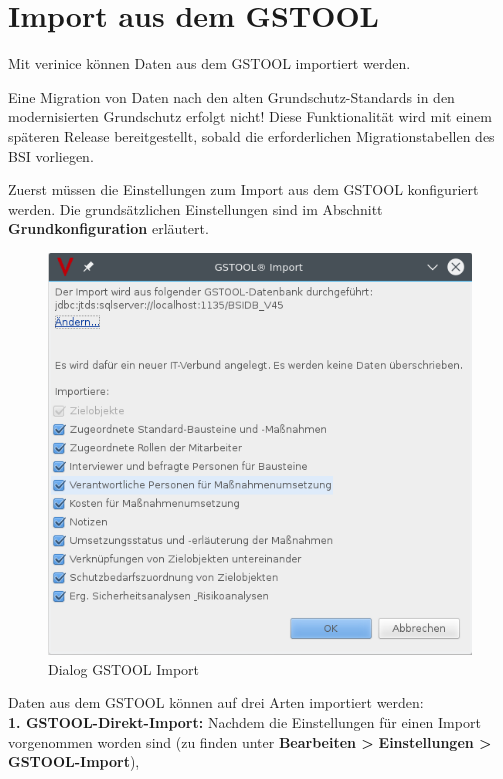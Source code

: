 \documentclass[a4paper,10pt]{book}
\begin{document}
\section{Import aus dem GSTOOL} \label{Import aus dem GSTOOL}
Mit verinice können Daten aus dem \textsc{GSTOOL} importiert werden.

Eine Migration von Daten nach den alten Grundschutz-Standards in den
modernisierten Grundschutz erfolgt nicht! Diese Funktionalität wird mit einem
späteren Release bereitgestellt, sobald die erforderlichen Migrationstabellen
des BSI vorliegen.

Zuerst müssen die Einstellungen zum Import aus dem \textsc{GSTOOL} konfiguriert werden. Die grund\-sätzlichen Einstellungen sind im Abschnitt \textbf{Grundkonfiguration} erläutert.
\begin{figure}[htb!]
  \centering
  \includegraphics[scale=.5]{Screenshot/gstool-import-dialog_de.png}
  \caption{\label{Dialog GSTOOL Import} Dialog GSTOOL Import}
\end{figure}
Daten aus dem \textsc{GSTOOL} können auf drei Arten importiert werden:
\newline\\
\textbf{1. \textsc{GSTOOL}-Direkt-Import:}
Nachdem die Einstellungen für einen Import vorgenommen worden sind (zu finden unter \textbf{Bearbeiten \textgreater} \textbf{ Einstellungen \textgreater}\textbf{ \textsc{GSTOOL}-Import}),
\end{document}

